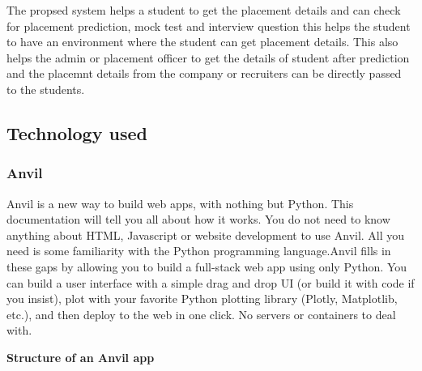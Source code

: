 \documentclass[12pt]{article}
\begin{document}
The propsed system helps a student to get the placement details and can check for placement prediction, mock test and interview question this helps the student to have an environment where the student can get placement details. This also helps the admin or placement officer to get the details of student after prediction and the placemnt details from the company or recruiters can be directly passed to the students. 

\subsection{Technology used}
\subsubsection{Anvil}
Anvil is a new way to build web apps, with nothing but Python. This documentation will tell you all about how it works.
You do not need to know anything about HTML, Javascript or website development to use Anvil. All you need is some familiarity with the Python programming language.Anvil fills in these gaps by allowing you to build a full-stack web app using only Python. You can build a user interface with a simple drag and drop UI (or build it with code if you insist), plot with your favorite Python plotting library (Plotly, Matplotlib, etc.), and then deploy to the web in one click. No servers or containers to deal with.

\textbf{Structure of an Anvil app}
\end{document}
